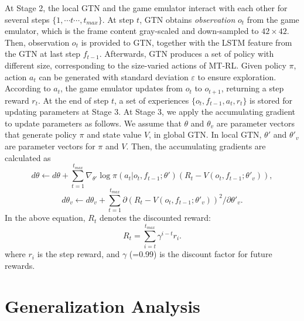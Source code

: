 \documentclass[letterpaper]{article} %
\begin{document}
At Stage 2, the local GTN and the game emulator interact with each other for several steps $\{1,\cdots t \cdots, t_{max}\}$.
At step $t$, GTN obtains \textit{observation} $o_t$ from the game emulator, which is the frame content gray-scaled and down-sampled to $42 \times 42$.
Then, observation $o_t$ is provided to GTN, together with the LSTM feature from the GTN at last step $f_{t-1}$.
Afterwards, GTN produces a set of policy with different size, corresponding to the size-varied actions of MT-RL.
Given policy $\pi$, action $a_t$ can be generated with standard deviation $\varepsilon$ to ensure exploration.
According to $a_t$, the game emulator updates from $o_t$ to $o_{t+1}$, returning a step reward $r_t$.
At the end of step $t$, a set of experiences $\{o_t,f_{t-1},a_t,r_t\}$ is stored for updating parameters at Stage 3.
At Stage 3, we apply the accumulating gradient to update parameters as follows. We assume that $\theta$ and $\theta_v$ are parameter vectors that generate policy $\pi$ and state value $V$, in global GTN. In local GTN, $\theta'$ and $\theta'_v$ are parameter vectors for $\pi$ and $V$. Then, the accumulating gradients are calculated as
\begin{equation}
\label{acc grad 1}
d\theta \leftarrow d \theta + \sum_{t=1}^{t_{max}} \nabla_{\theta'}\log\pi(a_t|o_t,f_{t-1};\theta')(R_t-V(o_t,f_{t-1};\theta'_v)),
\end{equation}
\begin{equation}
\label{acc grad 2}
d\theta_v \leftarrow d \theta_v + \sum_{t=1}^{t_{max}} \partial(R_t-V(o_t,f_{t-1};\theta'_v))^2/\partial\theta'_v.
\end{equation}
In the above equation, $R_t$ denotes the discounted reward:
 \begin{equation}
\label{R}
R_{t}=\sum_{i=t}^{t_{max}} \gamma^{i-t} r_{i}.
\end{equation}
where $r_i$ is the step reward, and $\gamma$ (=0.99) is the discount factor for future rewards.

\section{Generalization Analysis}
\label{section-generalization-analysis}
\end{document}
